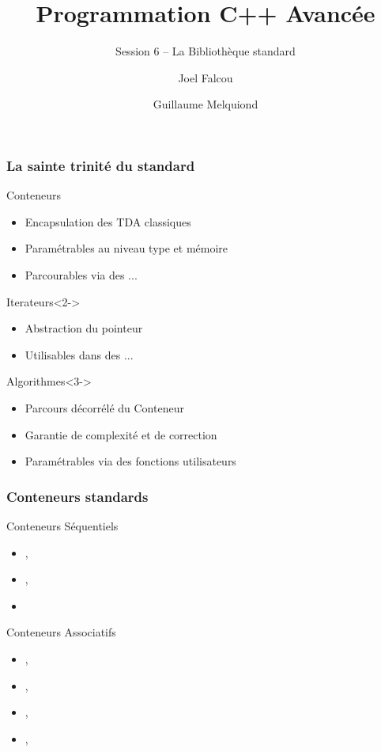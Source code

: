 \documentclass[svgnames]{beamer}
\title{Programmation C++ Avancée}
\subtitle{Session 6 -- La Bibliothèque standard}
\author{Joel Falcou \and Guillaume Melquiond}
\institute{Laboratoire de Recherche en Informatique}
\date{}
\begin{document}


\begin{frame}[plain]
\titlepage
\end{frame}
\setcounter{framenumber}{0}
\frame
{
  \frametitle{La sainte trinité du standard}
  \begin{block}{Conteneurs}
  \begin{itemize}\footnotesize
  \item Encapsulation des TDA classiques
  \item Paramétrables au niveau type et mémoire
  \item Parcourables via des ...
  \end{itemize}
  \end{block}{}
  \begin{block}{Iterateurs}<2->
  \begin{itemize}\footnotesize
  \item Abstraction du pointeur
  \item Utilisables dans des ...
  \end{itemize}
  \end{block}{}
  \begin{block}{Algorithmes}<3->
  \begin{itemize}\footnotesize
  \item Parcours décorrélé du Conteneur
  \item Garantie de complexité et de correction
  \item Paramétrables via des fonctions utilisateurs
  \end{itemize}
  \end{block}{}
}

\frame
{
  \frametitle{Conteneurs standards}
  \begin{block}{Conteneurs Séquentiels}
  \begin{itemize}
  \item {},
  \item {},
  \item {}
  \end{itemize}
  \end{block}{}

  \begin{block}{Conteneurs Associatifs}
  \begin{itemize}
  \item {},
  \item {},
  \item {},
  \item {},
  \end{itemize}
  \end{block}{}
}
\end{document}
